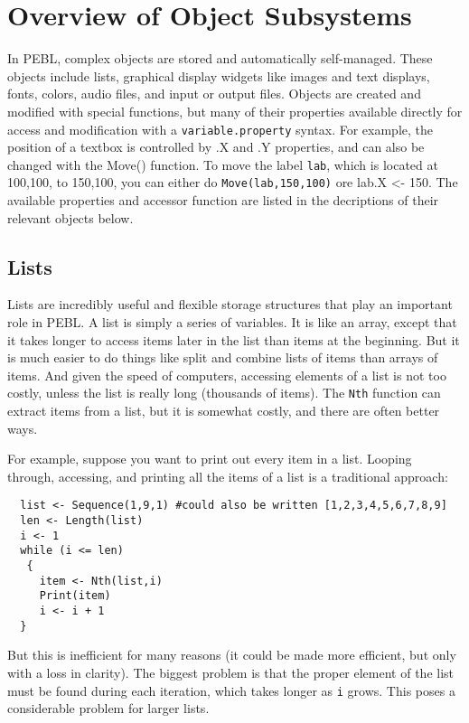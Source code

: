 \chapter
{Overview  of  Object Subsystems}

In PEBL, complex objects are stored and automatically self-managed.
These objects include lists, graphical display widgets like images and
text displays, fonts, colors, audio files, and input or output files.
Objects are created and modified with special functions, but many of their
properties available directly for access and modification with a
\texttt{variable.property} syntax.  For example, the position of a
textbox is controlled by .X and .Y properties, and can also be changed
with the Move() function.  To move the label \texttt{lab}, which is
located at 100,100,  to 150,100, you can either do
\texttt{Move(lab,150,100)} ore lab.X <- 150.  The available properties
and accessor function are listed in the decriptions of their relevant
objects below.


\section{Lists}

Lists are  incredibly useful and flexible storage
structures that play an important role in PEBL. A list is
simply a series of variables. It is  like an array, except
that it takes longer to access items later in the
list than items at the beginning. But it is much easier to
do things like split and combine lists of items than arrays of items. And given the speed of 
computers, accessing elements of a list is not too costly,
unless the list is really long (thousands of items). The \texttt{Nth} function can extract items from a list, but it is somewhat costly, and there are often better ways.


For example, suppose you want to print out every item in a list. Looping through, accessing, and printing all the items of a list is a traditional approach:
\begin{verbatim}
  list <- Sequence(1,9,1) #could also be written [1,2,3,4,5,6,7,8,9]
  len <- Length(list)
  i <- 1
  while (i <= len)
   {
     item <- Nth(list,i) 
     Print(item)
     i <- i + 1
  } 

\end{verbatim}
But this is inefficient for many reasons (it could be made more
efficient, but only with a loss in clarity). The biggest problem is
that the proper element of the list must be found during each
iteration, which takes longer as \texttt{i} grows. This poses a
considerable problem for larger lists.


